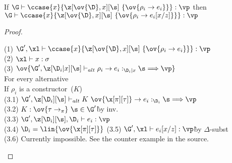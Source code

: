 \begin{lemma}
    If $\G \vdash \ccase{x}{\z[\ov{\D},x][\s]~\{\ov{\rho_i\to e_i}\}} : \vp$ then $\G \vdash \ccase{x}{\z[\ov{\D},x][\s]~\{\ov{\rho_i\to e_i[x/z]}\}} : \vp$
\end{lemma}

%
%
%
%
%
%
%
%
%

\begin{proof}~
\begin{tabbing}
    (1) $\G', \xl \vdash \ccase{x}{\z[\ov{\D},x][\s]~\{\ov{\rho_i\to e_i}\}} : \vp$\\
    (2) $\xl \vdash x : \sigma$\\
    (3) $\ov{\G',\z[\D_i|x][\s] \vdash_{alt} \rho_i \rightarrow e_i :_{\D_i | x} \s \Longrightarrow \vp}$\\
    For every alternative\\
    If $\rho_i$ is a constructor~($K$)\\
    (3.1) $\G',\z[\D_i][\s] \vdash_{alt} K~\ov{\x[\pi][\tau]} \rightarrow e_i :_{\D_i} \s \Longrightarrow \vp$\\
    (3.2) $K:\ov{\tau\to_\pi}~\s \in \G'$\`by inv.\\
    (3.3) $\G', \z[\D_i][\s],\D_i \vdash e_i : \vp$\\
    (3.4) $\D_i = \lin{\ov{\x[\pi][\tau]}}$
    (3.5) $\G',\xl \vdash e_i[x/z] : \vp$\` by $\Delta$-subst\\
    (3.6) Currently impossible. See the counter example in the source.
\end{tabbing}
\end{proof}



